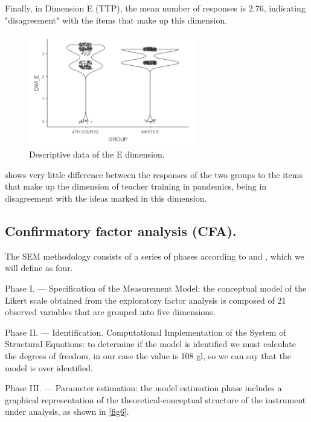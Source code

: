 \documentclass{textolivre}
\begin{document}
Finally, in Dimension E (TTP), the mean number of responses is 2.76, indicating "disagreement" with the items that make up this dimension.

\begin{figure}[htbp]
 \centering
 \includegraphics[width=0.65\textwidth]{fig5.png}
 \caption{Descriptive data of the E dimension.}
 \label{fig5}
\end{figure}

 shows very little difference between the responses of the two groups to the items that make up the dimension of teacher training in pandemics, being in disagreement with the ideas marked in this dimension.

\subsection{Confirmatory factor analysis (CFA).}
The SEM methodology consists of a series of phases according to \textcite{kaplan2000} %
and \textcite{kline2005}, %
which we will define as four.

Phase I. — Specification of the Measurement Model: the conceptual model of the Likert scale obtained from the exploratory factor analysis is composed of 21 observed variables that are grouped into five dimensions.

Phase II. — Identification. Computational Implementation of the System of Structural Equations: to determine if the model is identified we must calculate the degrees of freedom, in our case the value is 108 gl, so we can say that the model is over identified.

Phase III. — Parameter estimation: the model estimation phase includes a graphical representation of the theoretical-conceptual structure of the instrument under analysis, as shown in \cref{fig6}.
\end{document}
